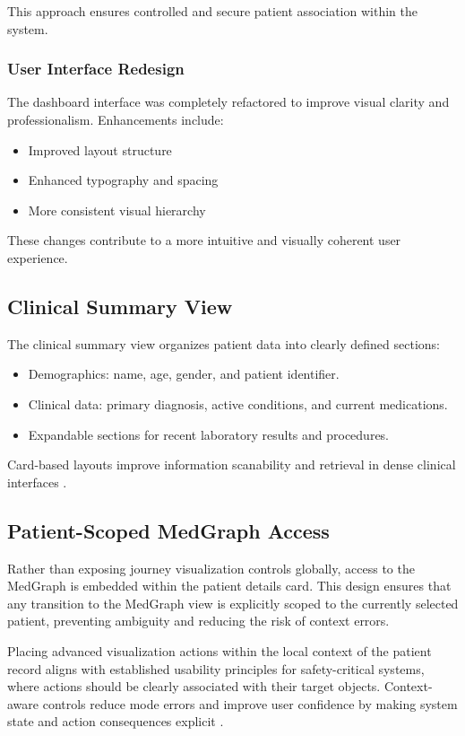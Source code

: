 \documentclass{article}
\begin{document}
This approach ensures controlled and secure patient association within the system.

\subsubsection{User Interface Redesign}

The dashboard interface was completely refactored to improve visual clarity and professionalism. Enhancements include:
\begin{itemize}
    \item Improved layout structure
    \item Enhanced typography and spacing
    \item More consistent visual hierarchy
\end{itemize}

These changes contribute to a more intuitive and visually coherent user experience.


\subsection{Clinical Summary View}

The clinical summary view organizes patient data into clearly defined sections:
\begin{itemize}
    \item Demographics: name, age, gender, and patient identifier.
    \item Clinical data: primary diagnosis, active conditions, and current medications.
    \item Expandable sections for recent laboratory results and procedures.
\end{itemize}

Card-based layouts improve information scanability and retrieval in dense
clinical interfaces \cite{clinicalDashboardsPROMs2024}.

\subsection{Patient-Scoped MedGraph Access}

Rather than exposing journey visualization controls globally, access to the
MedGraph is embedded within the patient details card. This design ensures that
any transition to the MedGraph view is explicitly scoped to the currently
selected patient, preventing ambiguity and reducing the risk of context errors.

Placing advanced visualization actions within the local context of the patient
record aligns with established usability principles for safety-critical
systems, where actions should be clearly associated with their target objects.
Context-aware controls reduce mode errors and improve user confidence by making
system state and action consequences explicit .
\end{document}

